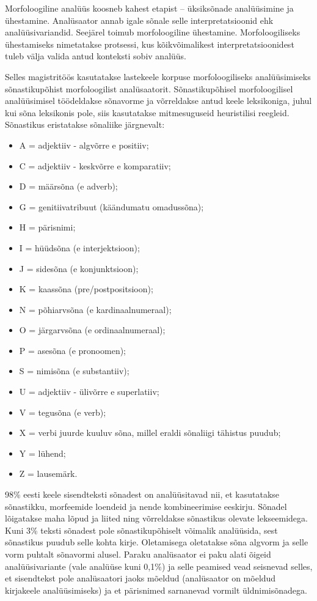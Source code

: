 \documentclass[12pt]{article}
\begin{document}
Morfoloogiline analüüs koosneb kahest etapist -- üksiksõnade analüüsimine ja ühestamine. Analüsaator annab igale sõnale selle interpretatsioonid ehk analüüsivariandid. Seejärel toimub morfoloogiline ühestamine. Morfoloogiliseks ühestamiseks nimetatakse protsessi, kus kõikvõimalikest interpretatsioonidest tuleb välja valida antud konteksti sobiv analüüs.\citep[90]{KV}

Selles magistritöös kasutatakse lastekeele korpuse morfoloogiliseks analüüsimiseks sõnastikupõhist morfoloogilist analüsaatorit. Sõnastikupõhisel morfoloogilisel analüüsimisel töödeldakse sõnavorme ja võrreldakse antud keele leksikoniga, juhul kui sõna leksikonis pole, siis kasutatakse mitmesuguseid heuristilisi reegleid. Sõnastikus eristatakse sõnaliike järgnevalt:


\begin{itemize}
    \item A = adjektiiv - algvõrre e positiiv;
    \item C = adjektiiv - keskvõrre e komparatiiv;
    \item D = määrsõna (e adverb);
    \item G = genitiivatribuut (käändumatu omadussõna);
    \item H = pärisnimi;
    \item I = hüüdsõna (e interjektsioon);
    \item J = sidesõna (e konjunktsioon);
    \item K = kaassõna (pre/postpositsioon);
    \item N = põhiarvsõna (e kardinaalnumeraal);
    \item O = järgarvsõna (e ordinaalnumeraal);
    \item P = asesõna (e pronoomen);
    \item S = nimisõna (e substantiiv);
    \item U = adjektiiv - ülivõrre e superlatiiv;
    \item V = tegusõna (e verb);
    \item X = verbi juurde kuuluv sõna, millel eraldi sõnaliigi tähistus puudub;
    \item Y = lühend;
    \item Z = lausemärk. \citep{VABAMORF}
\end{itemize}




98\% eesti keele sisendteksti sõnadest on analüüsitavad nii, et kasutatakse sõnastikku, morfeemide loendeid ja nende kombineerimise eeskirju. Sõnadel lõigatakse maha lõpud ja liited ning võrreldakse sõnastikus olevate lekseemidega. Kuni 3\% teksti sõnadest pole sõnastikupõhiselt võimalik analüüsida, sest sõnastikus puudub selle kohta kirje. Oletamisega oletatakse sõna algvorm ja selle vorm puhtalt sõnavormi alusel. Paraku analüsaator ei paku alati õigeid analüüsivariante (vale analüüse kuni 0,1\%) ja selle peamised vead seisnevad selles, et sisendtekst pole analüsaatori jaoks mõeldud (analüsaator on mõeldud kirjakeele analüüsimiseks) ja et pärisnimed sarnanevad vormilt üldnimisõnadega. \citep[91--93]{KV}
\end{document}
